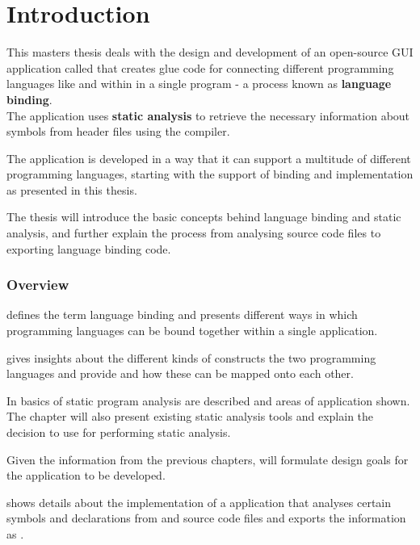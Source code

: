 \chapter{Introduction}

This masters thesis deals with the design and development of an open-source GUI application called  that creates glue code for connecting different programming languages like  and  within in a single program - a process known as \textbf{language binding}.\\
The application uses \textbf{static analysis} to retrieve the necessary information about symbols from  header files using the   compiler.

The application is developed in a way that it can support a multitude of different programming languages, starting with the support of binding  and  implementation  as presented in this thesis.

The thesis will introduce the basic concepts behind language binding and static analysis, and further explain the process from analysing source code files to exporting language binding code.

\subsection{Overview}

 defines the term language binding and presents different ways in which programming languages can be bound together within a single application.

 gives insights about the different kinds of constructs the two programming languages  and  provide and how these can be mapped onto each other.

In  basics of static program analysis are described and areas of application shown. The chapter will also present existing static analysis tools and explain the decision to use  for performing static analysis.

Given the information from the previous chapters,  will formulate design goals for the application to be developed.

 shows details about the implementation of a  application that analyses certain symbols and declarations from  and  source code files and exports the information as .

